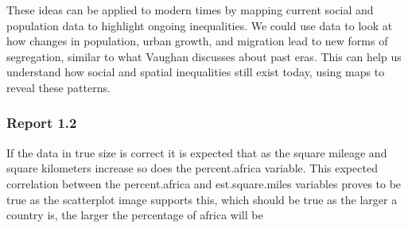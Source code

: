 \documentclass[
]{article}
\newenvironment{Shaded}{\begin{snugshade}}{\end{snugshade}}
\newcommand{\AttributeTok}[1]{\textcolor[rgb]{0.13,0.29,0.53}{#1}}
\newcommand{\DecValTok}[1]{\textcolor[rgb]{0.00,0.00,0.81}{#1}}
\newcommand{\FunctionTok}[1]{\textcolor[rgb]{0.13,0.29,0.53}{\textbf{#1}}}
\newcommand{\NormalTok}[1]{#1}
\newcommand{\SpecialCharTok}[1]{\textcolor[rgb]{0.81,0.36,0.00}{\textbf{#1}}}
\begin{document}
These ideas can be applied to modern times by mapping current social and
population data to highlight ongoing inequalities. We could use data to
look at how changes in population, urban growth, and migration lead to
new forms of segregation, similar to what Vaughan discusses about past
eras. This can help us understand how social and spatial inequalities
still exist today, using maps to reveal these patterns.

\subsubsection{Report 1.2}\label{report-1.2}

If the data in true size is correct it is expected that as the square
mileage and square kilometers increase so does the percent.africa
variable. This expected correlation between the percent.africa and
est.square.miles variables proves to be true as the scatterplot image
supports this, which should be true as the larger a country is, the
larger the percentage of africa will be

\begin{Shaded}
\end{Shaded}
\end{document}
